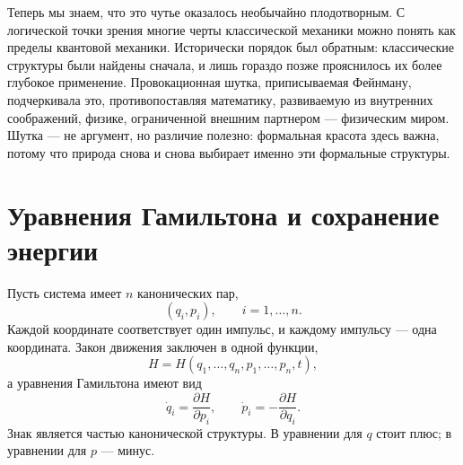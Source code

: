 Теперь мы знаем, что это чутье оказалось необычайно плодотворным. С логической точки зрения многие черты классической механики можно понять как пределы квантовой механики. Исторически порядок был обратным: классические структуры были найдены сначала, и лишь гораздо позже прояснилось их более глубокое применение. Провокационная шутка, приписываемая Фейнману, подчеркивала это, противопоставляя математику, развиваемую из внутренних соображений, физике, ограниченной внешним партнером — физическим миром. Шутка — не аргумент, но различие полезно: формальная красота здесь важна, потому что природа снова и снова выбирает именно эти формальные структуры.

\begin{classroomqa}
\end{classroomqa}

\section{Уравнения Гамильтона и сохранение энергии}

Пусть система имеет \(n\) канонических пар,
\begin{equation}
  (q_i,p_i),\qquad i=1,\ldots,n.
  \label{eq:l7-canonical-pairs}
\end{equation}
Каждой координате соответствует один импульс, и каждому импульсу — одна координата. Закон движения заключен в одной функции,
\begin{equation}
  H=H(q_1,\ldots,q_n,p_1,\ldots,p_n,t),
  \label{eq:l7-hamiltonian}
\end{equation}
а уравнения Гамильтона имеют вид
\begin{equation}
  \boxed{
  \dot q_i=\frac{\partial H}{\partial p_i},
  \qquad
  \dot p_i=-\frac{\partial H}{\partial q_i}.}
  \label{eq:l7-hamilton-equations}
\end{equation}
Знак является частью канонической структуры. В уравнении для \(q\) стоит плюс; в уравнении для \(p\) — минус.

